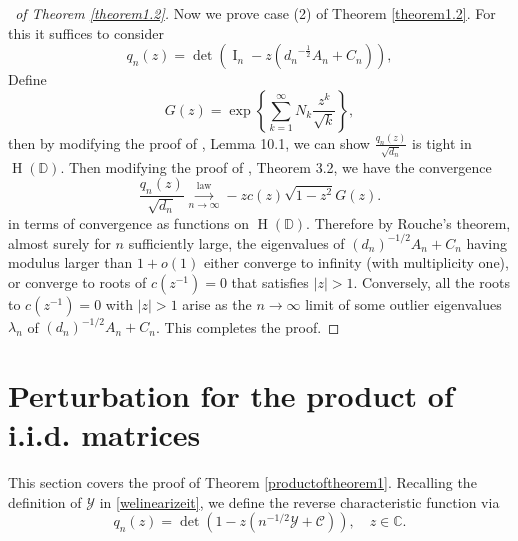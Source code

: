 \documentclass[12pt, reqno]{amsart}
\theoremstyle{definition}
\theoremstyle{remark}
\numberwithin{equation}{section}
\begin{document}
\begin{proof}[\proofname\ of Theorem \ref{theorem1.2}]
    Now we prove case (2) of Theorem \ref{theorem1.2}. For this it suffices to consider 
    $$
q_n(z)=\det(\operatorname{I}_n-z({d_n}^{-\frac{1}{2}}A_n+C_n)),
    $$
    Define 
    \begin{equation}
        G(z)=\exp\left\{\sum_{k=1}^\infty N_k\frac{z^k}{\sqrt{k}}\right\},
    \end{equation} then by modifying the proof of \cite{coste2023sparse}, Lemma 10.1, we can show $\frac{q_n(z)}{\sqrt{d_n}}$ is tight in $\operatorname{H}(\mathbb{D})$. Then modifying the proof of \cite{coste2023sparse}, Theorem 3.2, we have the convergence
    \begin{equation}
\frac{q_n(z)}{\sqrt{d_n}}\overset{\text{law}}{\underset{n\to\infty}{\longrightarrow}} -zc(z)\sqrt{1-z^2}G(z).
    \end{equation}
    in terms of convergence as functions on $\operatorname{H}(\mathbb{D})$. Therefore by Rouche's theorem, almost surely for $n$ sufficiently large, the eigenvalues of $(d_n)^{-1/2}A_n+C_n$ having modulus larger than $1+o(1)$ either converge to infinity (with multiplicity one), or converge to roots of $c(z^{-1})=0$ that satisfies $|z|>1$. Conversely, all the roots to $c(z^{-1})=0$ with $|z|>1$ arise as the $n\to\infty$ limit of some outlier eigenvalues $\lambda_n$ of $(d_n)^{-1/2}A_n+C_n$. This completes the proof.
\end{proof}

\section{Perturbation for the product of i.i.d. matrices}


This section covers the proof of Theorem \ref{productoftheorem1}. 
Recalling the definition of $\mathcal{Y}$ in \eqref{welinearizeit}, we define the reverse characteristic function via 
$$
q_n(z)=\det(1-z(n^{-1/2}\mathcal{Y}+\mathcal{C})),\quad z\in\mathbb{C}.
$$
\end{document}

